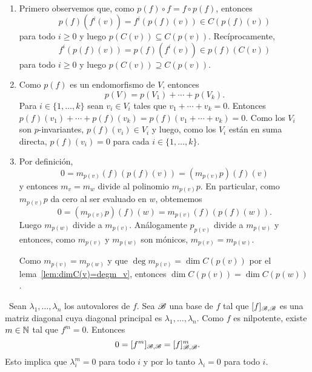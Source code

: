 \begin{solution}\
    \begin{enumerate}
        \item Primero observemos que, como $p(f)\circ f=f\circ p(f)$, entonces
            \[
            p(f)(f^i(v))=f^i(p(f)(v))\in C(p(f)(v))
            \]
            para todo $i\geq0$ y luego $p(C(v))\subseteq C(p(v))$. Recíprocamente, 
            \[
            f^i(p(f)(v))=p(f)(f^i(v))\in p(f)(C(v))
            \]
            para todo $i\geq0$ y luego $p(C(v))\supseteq C(p(v))$.
        \item Como $p(f)$ es un endomorfismo de $V$, entonces \[
            p(V)=p(V_1)+\cdots+p(V_k). 
            \]
            Para $i\in\{1,\dots,k\}$ sean $v_i\in V_i$ tales que
            $v_1+\cdots+v_k=0$. Entonces
            $p(f)(v_1)+\cdots+p(f)(v_k)=p(f)(v_1+\cdots+v_k)=0$. Como
            los $V_i$ son $p$-invariantes, $p(f)(v_i)\in V_i$ y luego, como
            los $V_i$ están en suma directa, $p(f)(v_i)=0$ para cada 
            $i\in\{1,\dots,k\}$. 
        \item Por definición, 
            \[
            0=m_{p(v)}(f)(p(f)(v))=(m_{p(v)}p)(f)(v)
            \]
            y entonces $m_v=m_w$ divide al polinomio $m_{p(v)}p$. En
            particular, como $m_{p(v)}p$ da cero al ser evaluado en $w$, obtememos
            \[
            0=(m_{p(v)}p)(f)(w)=m_{p(v)}(f)(p(f)(w)).
            \]
            Luego $m_{p(w)}$ divide a $m_{p(v)}$. Análogamente $p_{p(v)}$
            divide a $m_{p(w)}$ y  entonces, como $m_{p(v)}$ y $m_{p(w)}$ son
            mónicos, $m_{p(v)}=m_{p(w)}$. 

            Como $m_{p(v)}=m_{p(w)}$ y que $\deg
            m_{p(v)}=\dim C(p(v))$ por el lema~\ref{lem:dimC(v)=degm_v}, entonces
            $\dim C(p(v))=\dim C(p(w))$.
    \end{enumerate}
\end{solution}

\begin{solution}[ejercicio~\ref{xca:nilpotente_y_diagonalizable=0}]\
    Sean $\lambda_1,\dots,\lambda_n$ los autovalores de $f$. 
    Sea $\mathscr{B}$ una base de $f$ tal que $[f]_{\mathscr{B},\mathscr{B}}$ es una matriz diagonal
    cuya diagonal principal es $\lambda_1,\dots,\lambda_n$. Como $f$ es
    nilpotente, existe $m\in\mathbb{N}$ tal que $f^m=0$. Entonces 
    \[
    0=[f^m]_{\mathscr{B},\mathscr{B}}=[f]_{\mathscr{B},\mathscr{B}}^m.
    \]
    Esto implica que $\lambda_i^m=0$ para todo $i$ y por lo
    tanto $\lambda_i=0$ para todo $i$. 
\end{solution}

